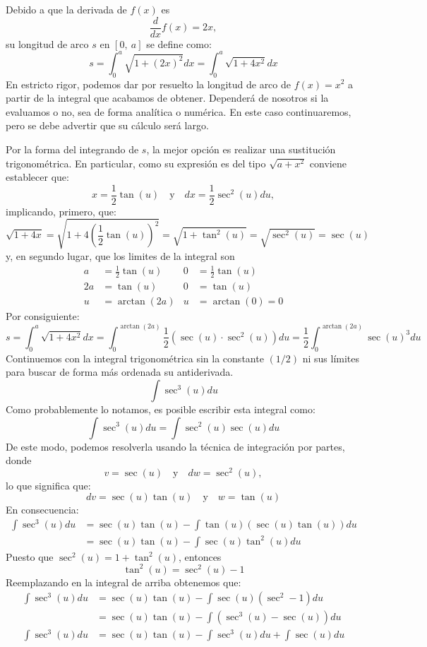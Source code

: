 \documentclass[12pt]{article}
\begin{document}
Debido a que la derivada de $f(x)$ es
\[
  \frac{d}{dx} f(x) = 2x,
\]
su longitud de arco $s$ en $[0, \ a]$ se define como:
\[
  s = \int_{0}^{a} \sqrt{1 + (2x)^{2}} dx = \int_{0}^{a} \sqrt{1 + 4x^{2}} dx
\]
En estricto rigor, podemos dar por resuelto la longitud de arco de $f(x) = x^{2}$ a partir de la integral que acabamos de obtener. Dependerá de nosotros si la evaluamos o no, sea de forma analítica o numérica. En este caso continuaremos, pero se debe advertir que su cálculo será largo.

Por la forma del integrando de $s$, la mejor opción es realizar una sustitución trigonométrica. En particular, como su expresión es del tipo $\sqrt{a + x^{2}}$ conviene establecer que:
\[
  x = \frac{1}{2} \tan(u) \quad \text{y} \quad dx = \frac{1}{2} \sec^{2}(u) du,
\]
implicando, primero, que:
\[
  \sqrt{1 + 4x} = \sqrt{1 + 4 \left(\frac{1}{2} \tan(u)\right)^{2}}
                = \sqrt{1 + \tan^{2}(u)}
                = \sqrt{\sec^{2}(u)}
                = \sec(u)
\]
y, en segundo lugar, que los limites de la integral son
\begin{align*}
  a &= \frac{1}{2} \tan(u) & 0 &= \frac{1}{2} \tan(u) \\
  2a &= \tan(u)            & 0 &= \tan(u) \\
  u &= \arctan(2a) & u     &= \arctan(0) = 0
\end{align*}
Por consiguiente:
\[
  s = \int_{0}^{a} \sqrt{1 + 4x^{2}}dx
    = \int_{0}^{\arctan(2a)} \frac{1}{2} \left(\sec(u) \cdot \sec^{2}(u)\right) du
    = \frac{1}{2} \int_{0}^{\arctan(2a)} \sec(u)^{3} du
\]
Continuemos con la integral trigonométrica sin la constante $(1/2)$ ni sus límites para buscar de forma más ordenada su antiderivada.
\[
  \int \sec^{3}(u) du
\]
Como probablemente lo notamos, es posible escribir esta integral como:
\[
  \int \sec^{3}(u) du = \int \sec^{2}(u) \sec(u) du
\]
De este modo, podemos resolverla usando la técnica de integración por partes, donde
\[
  v = \sec(u) \quad \text{y} \quad dw = \sec^{2}(u),
\]
lo que significa que:
\[
  dv = \sec(u) \tan(u) \quad \text{y} \quad w = \tan(u)
\]
En consecuencia:
\begin{align*}
  \int \sec^{3}(u) du &= \sec(u) \tan(u) - \int \tan(u) (\sec(u) \tan(u)) du \\
                      &= \sec(u) \tan(u) - \int \sec(u) \tan^{2}(u) du
\end{align*}
Puesto que $\sec^{2}(u) = 1 + \tan^{2}(u)$, entonces
\[
  \tan^{2}(u) = \sec^{2}(u) - 1
\]
Reemplazando en la integral de arriba obtenemos que:
\begin{align*}
  \int \sec^{3}(u) du &= \sec(u) \tan(u) - \int \sec(u) (\sec^{2} - 1) du \\
                      &= \sec(u) \tan(u) - \int \left(\sec^{3}(u) - \sec(u)\right) du \\
  \int \sec^{3}(u) du &= \sec(u) \tan(u) - \int \sec^{3}(u) du + \int \sec(u) du
\end{align*}
\end{document}
